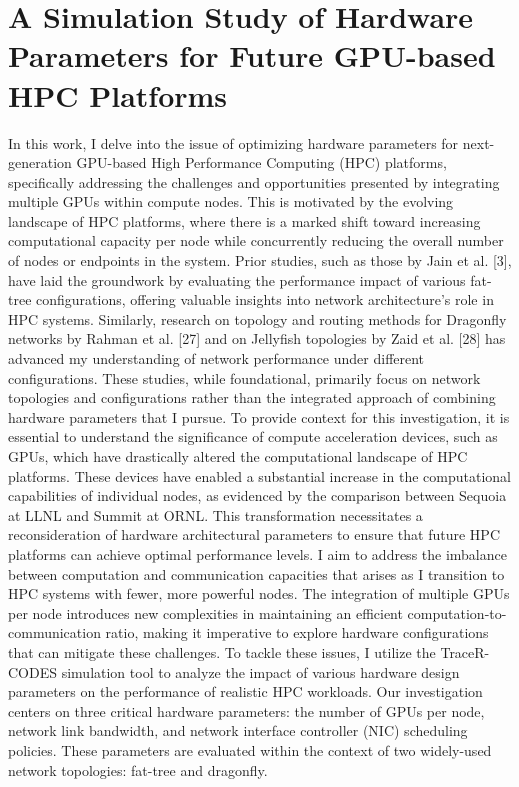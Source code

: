 \chapter{A Simulation Study of Hardware Parameters for Future GPU-based HPC Platforms}

 In this work, I delve into the issue of optimizing hardware parameters for next-generation GPU-based High Performance Computing (HPC) platforms, specifically addressing the challenges and opportunities presented by integrating multiple GPUs within compute nodes. This is motivated by the evolving landscape of HPC platforms, where there is a marked shift toward increasing computational capacity per node while concurrently reducing the overall number of nodes or endpoints in the system.
Prior studies, such as those by Jain et al. [3], have laid the groundwork by evaluating the performance impact of various fat-tree configurations, offering valuable insights into network architecture's role in HPC systems. Similarly, research on topology and routing methods for Dragonfly networks by Rahman et al. [27] and on Jellyfish topologies by Zaid et al. [28] has advanced my understanding of network performance under different configurations. These studies, while foundational, primarily focus on network topologies and configurations rather than the integrated approach of combining hardware parameters that I pursue.
To provide context for this investigation, it is essential to understand the significance of compute acceleration devices, such as GPUs, which have drastically altered the computational landscape of HPC platforms. These devices have enabled a substantial increase in the computational capabilities of individual nodes, as evidenced by the comparison between Sequoia at LLNL and Summit at ORNL. This transformation necessitates a reconsideration of hardware architectural parameters to ensure that future HPC platforms can achieve optimal performance levels.
I aim to address the imbalance between computation and communication capacities that arises as I transition to HPC systems with fewer, more powerful nodes. The integration of multiple GPUs per node introduces new complexities in maintaining an efficient computation-to-communication ratio, making it imperative to explore hardware configurations that can mitigate these challenges.
To tackle these issues, I utilize the TraceR-CODES simulation tool to analyze the impact of various hardware design parameters on the performance of realistic HPC workloads. Our investigation centers on three critical hardware parameters: the number of GPUs per node, network link bandwidth, and network interface controller (NIC) scheduling policies. These parameters are evaluated within the context of two widely-used network topologies: fat-tree and dragonfly.
